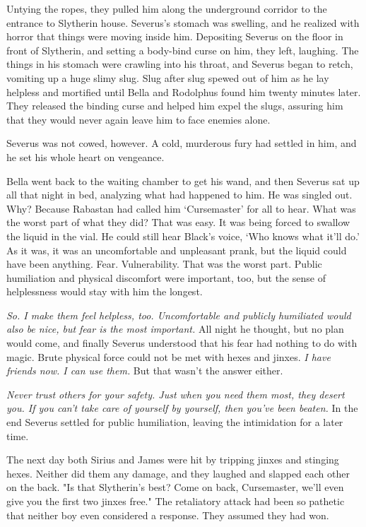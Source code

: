 Untying the ropes, they pulled him along the underground corridor to the entrance to Slytherin house. Severus's stomach was swelling, and he realized with horror that things were moving inside him. Depositing Severus on the floor in front of Slytherin, and setting a body-bind curse on him, they left, laughing. The things in his stomach were crawling into his throat, and Severus began to retch, vomiting up a huge slimy slug. Slug after slug spewed out of him as he lay helpless and mortified until Bella and Rodolphus found him twenty minutes later. They released the binding curse and helped him expel the slugs, assuring him that they would never again leave him to face enemies alone.

Severus was not cowed, however. A cold, murderous fury had settled in him, and he set his whole heart on vengeance.

Bella went back to the waiting chamber to get his wand, and then Severus sat up all that night in bed, analyzing what had happened to him. He was singled out. Why? Because Rabastan had called him `Cursemaster' for all to hear. What was the worst part of what they did? That was easy. It was being forced to swallow the liquid in the vial. He could still hear Black's voice, `Who knows what it'll do.' As it was, it was an uncomfortable and unpleasant prank, but the liquid could have been anything. Fear. Vulnerability. That was the worst part. Public humiliation and physical discomfort were important, too, but the sense of helplessness would stay with him the longest.

\emph{So. I make them feel helpless, too. Uncomfortable and publicly humiliated would also be nice, but fear is the most important.} All night he thought, but no plan would come, and finally Severus understood that his fear had nothing to do with magic. Brute physical force could not be met with hexes and jinxes. \emph{I have friends now. I can use them.} But that wasn't the answer either.

\emph{Never trust others for your safety. Just when you need them most, they desert you. If you can't take care of yourself by yourself, then you've been beaten.} In the end Severus settled for public humiliation, leaving the intimidation for a later time.

The next day both Sirius and James were hit by tripping jinxes and stinging hexes. Neither did them any damage, and they laughed and slapped each other on the back. "Is that Slytherin's best? Come on back, Cursemaster, we'll even give you the first two jinxes free." The retaliatory attack had been so pathetic that neither boy even considered a response. They assumed they had won.

